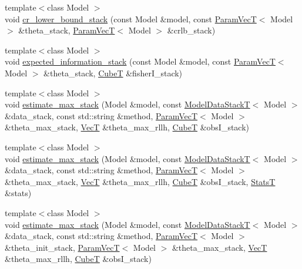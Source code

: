 \begin{DoxyCompactItemize}
{\footnotesize template$<$class Model $>$ }\\void \hyperlink{namespacemappel_1_1methods_1_1openmp_aba5970f5df4416a3d26c3ca5a86b8da5}{cr\+\_\+lower\+\_\+bound\+\_\+stack} (const Model \&model, const \hyperlink{namespacemappel_a0f86d3153e4e27b095012f140eea58de}{Param\+VecT}$<$ Model $>$ \&theta\+\_\+stack, \hyperlink{namespacemappel_a0f86d3153e4e27b095012f140eea58de}{Param\+VecT}$<$ Model $>$ \&crlb\+\_\+stack)
\item 
{\footnotesize template$<$class Model $>$ }\\void \hyperlink{namespacemappel_1_1methods_1_1openmp_ad58ad93952714ee5b5d7701cdf6032a8}{expected\+\_\+information\+\_\+stack} (const Model \&model, const \hyperlink{namespacemappel_a0f86d3153e4e27b095012f140eea58de}{Param\+VecT}$<$ Model $>$ \&theta\+\_\+stack, \hyperlink{namespacemappel_ab2afab4e6c8805e83946670d882768c2}{CubeT} \&fisher\+I\+\_\+stack)
\item 
{\footnotesize template$<$class Model $>$ }\\void \hyperlink{namespacemappel_1_1methods_1_1openmp_aaf30517efe932ae2e79b740658c1e63e}{estimate\+\_\+max\+\_\+stack} (Model \&model, const \hyperlink{namespacemappel_aaeb6665bc57476dd93c2df6ad8bc4768}{Model\+Data\+StackT}$<$ Model $>$ \&data\+\_\+stack, const std\+::string \&method, \hyperlink{namespacemappel_a0f86d3153e4e27b095012f140eea58de}{Param\+VecT}$<$ Model $>$ \&theta\+\_\+max\+\_\+stack, \hyperlink{namespacemappel_a2225ad69f358daa3f4f99282a35b9a3a}{VecT} \&theta\+\_\+max\+\_\+rllh, \hyperlink{namespacemappel_ab2afab4e6c8805e83946670d882768c2}{CubeT} \&obs\+I\+\_\+stack)
\item 
{\footnotesize template$<$class Model $>$ }\\void \hyperlink{namespacemappel_1_1methods_1_1openmp_a9854c4b2a406b628092b91053e91886c}{estimate\+\_\+max\+\_\+stack} (Model \&model, const \hyperlink{namespacemappel_aaeb6665bc57476dd93c2df6ad8bc4768}{Model\+Data\+StackT}$<$ Model $>$ \&data\+\_\+stack, const std\+::string \&method, \hyperlink{namespacemappel_a0f86d3153e4e27b095012f140eea58de}{Param\+VecT}$<$ Model $>$ \&theta\+\_\+max\+\_\+stack, \hyperlink{namespacemappel_a2225ad69f358daa3f4f99282a35b9a3a}{VecT} \&theta\+\_\+max\+\_\+rllh, \hyperlink{namespacemappel_ab2afab4e6c8805e83946670d882768c2}{CubeT} \&obs\+I\+\_\+stack, \hyperlink{namespacemappel_a04ab395b0cf82c4ce68a36b2212649a5}{StatsT} \&stats)
\item 
{\footnotesize template$<$class Model $>$ }\\void \hyperlink{namespacemappel_1_1methods_1_1openmp_a12da8e623d7d4aab4958232f0ffe0a3e}{estimate\+\_\+max\+\_\+stack} (Model \&model, const \hyperlink{namespacemappel_aaeb6665bc57476dd93c2df6ad8bc4768}{Model\+Data\+StackT}$<$ Model $>$ \&data\+\_\+stack, const std\+::string \&method, \hyperlink{namespacemappel_a0f86d3153e4e27b095012f140eea58de}{Param\+VecT}$<$ Model $>$ \&theta\+\_\+init\+\_\+stack, \hyperlink{namespacemappel_a0f86d3153e4e27b095012f140eea58de}{Param\+VecT}$<$ Model $>$ \&theta\+\_\+max\+\_\+stack, \hyperlink{namespacemappel_a2225ad69f358daa3f4f99282a35b9a3a}{VecT} \&theta\+\_\+max\+\_\+rllh, \hyperlink{namespacemappel_ab2afab4e6c8805e83946670d882768c2}{CubeT} \&obs\+I\+\_\+stack)

\end{DoxyCompactItemize}
